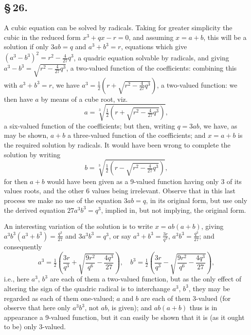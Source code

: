 \documentclass[11pt,a4paper]{book}
\begin{document}
\subsection*{\S\,26.}

A cubic equation can be solved by radicals. Taking for greater simplicity the cubic in the reduced form $x^{3} + qx - r = 0$, and assuming $x = a + b$, this will be a solution if only $3ab = q$ and $a^{3} + b^{3} = r$, equations which give $(a^{3} - b^{3})^{2} = r^{2} - \frac{4}{27}q^{3}$, a quadric equation solvable by radicals, and giving $a^{3} - b^{3} = \sqrt{r^{2} - \frac{4}{27}q^{3}}$, a two-valued function of the coefficients: combining this with $a^{3} + b^{3} = r$, we have $a^{3} = \frac{1}{2}(r + \sqrt{r^{2} - \frac{4}{27}q^{3}})$, a two-valued function: we then have $a$ by means of a cube root, viz.
\[
a = \sqrt[3]{\tfrac{1}{2}(r + \sqrt{r^{2} - \tfrac{4}{27}q^{3}})},
\]
a six-valued function of the coefficients; but then, writing $q = 3ab$, we have, as may be shown, $a + b$ a three-valued function of the coefficients; and $x = a + b$ is the required solution by radicals. It would have been wrong to complete the solution by writing
\[
b = \sqrt[3]{\tfrac{1}{2}(r - \sqrt{r^{2} - \tfrac{4}{27}q^{3}})},
\]
for then $a + b$ would have been given as a 9-valued function having only 3 of its values roots, and the other 6 values being irrelevant. Observe that in this last process we make no use of the equation $3ab = q$, in its original form, but use only the derived equation $27a^{3}b^{3} = q^{3}$, implied in, but not implying, the original form.

An interesting variation of the solution is to write $x = ab(a + b)$, giving $a^{3}b^{3}(a^{3} + b^{3}) = \frac{q^{3}}{27}$ and $3a^{3}b^{3} = q^{3}$, or say $a^{3} + b^{3} = \frac{3r}{q^{3}}$, $a^{3}b^{3} = \frac{q^{3}}{27}$; and consequently
\[
a^{3} = \tfrac{1}{2}\left(\frac{3r}{q^{3}} + \sqrt{\frac{9r^{2}}{q^{6}} - \frac{4q^{3}}{27}}\right), \quad b^{3} = \tfrac{1}{2}\left(\frac{3r}{q^{3}} - \sqrt{\frac{9r^{2}}{q^{6}} - \frac{4q^{3}}{27}}\right),
\]
i.e., here $a^{3}$, $b^{3}$ are each of them a two-valued function, but as the only effect of altering the sign of the quadric radical is to interchange $a^{3}$, $b^{3}$, they may be regarded as each of them one-valued; $a$ and $b$ are each of them 3-valued (for observe that here only $a^{3}b^{3}$, not $ab$, is given); and $ab(a + b)$ thus is in appearance a 9-valued function, but it can easily be shown that it is (as it ought to be) only 3-valued.
\end{document}
